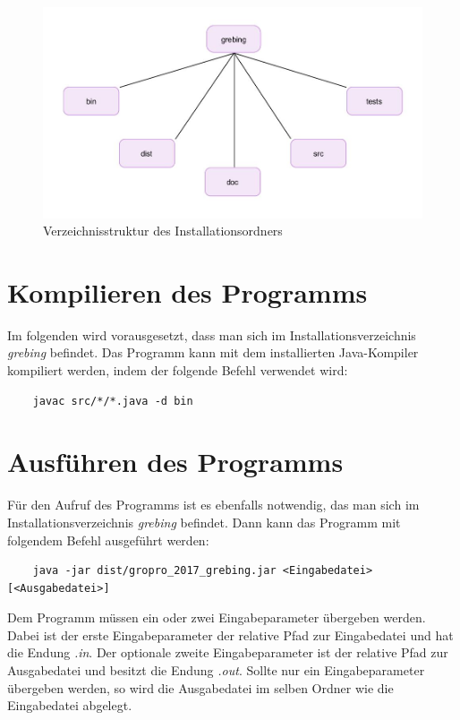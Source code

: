 \begin{figure}[H]
	\includegraphics[width=15cm]{./Graphics/verzeichnisstruktur.JPG}
	\caption{Verzeichnisstruktur des Installationsordners}
	\label{grafik:verzeichnisstruktur}
\end{figure}



\section{Kompilieren des Programms}
Im folgenden wird vorausgesetzt, dass man sich im Installationsverzeichnis \textit{grebing} befindet.
Das Programm kann mit dem installierten Java-Kompiler kompiliert werden, indem der folgende Befehl verwendet wird:

\begin{lstlisting}
	javac src/*/*.java -d bin
\end{lstlisting}

\section{Ausführen des Programms}
Für den Aufruf des Programms ist es ebenfalls notwendig, das man sich im Installationsverzeichnis \textit{grebing} befindet. Dann kann das Programm mit folgendem Befehl ausgeführt werden:

\begin{lstlisting}
	java -jar dist/gropro_2017_grebing.jar <Eingabedatei> [<Ausgabedatei>]
\end{lstlisting}

Dem Programm müssen ein oder zwei Eingabeparameter übergeben werden. Dabei ist der erste Eingabeparameter der relative Pfad zur Eingabedatei und hat die Endung \textit{.in}. Der optionale zweite Eingabeparameter ist der relative Pfad zur Ausgabedatei und besitzt die Endung \textit{.out}. Sollte nur ein Eingabeparameter übergeben werden, so wird die Ausgabedatei im selben Ordner wie die Eingabedatei abgelegt.


